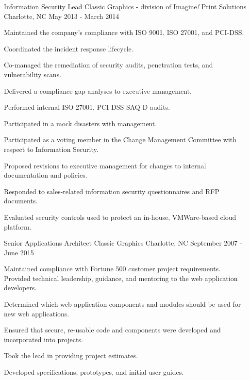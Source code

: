 \begin{cventries}

\cventry
{Information Security Lead}
{Classic Graphics - division of Imagine{\it !} Print Solutions} %
{Charlotte, NC} %
{May 2013 - March 2014} %
{
Maintained the company's compliance with ISO 9001, ISO 27001, and PCI-DSS.
\begin{cvitems}
\item[]
\item {Coordinated the incident response lifecycle.}
\item {Co-managed the remediation of security audits, penetration tests, and vulnerability scans.}
\item {Delivered a compliance gap analyses to executive management.}
\item {Performed internal ISO 27001, PCI-DSS SAQ D audits.}
\item {Participated in a mock disasters with management.}
\item {Participated as a voting member in the Change Management Committee with respect to Information Security.}
\item {Proposed revisions to executive management for changes to internal documentation and policies.}
\item {Responded to sales-related information security questionnaires and RFP documents.}
\item {Evaluated security controls used to protect an in-house, VMWare-based cloud platform.}
\end{cvitems}
}


\cventry
{Senior Applications Architect}
{Classic Graphics} %
{Charlotte, NC} %
{September 2007 - June 2015} %
{
Maintained compliance with Fortune 500 customer project requirements. Provided technical leadership, guidance, and mentoring to the web application developers.
\begin{cvitems}
\item[]
\item {Determined which web application components and modules should be used for new web applications.}
\item {Ensured that secure, re-usable code and components were developed and incorporated into projects.}
\item {Took the lead in providing project estimates.}
\item {Developed specifications, prototypes, and initial user guides.}
\end{cvitems}
}


\end{cventries}
